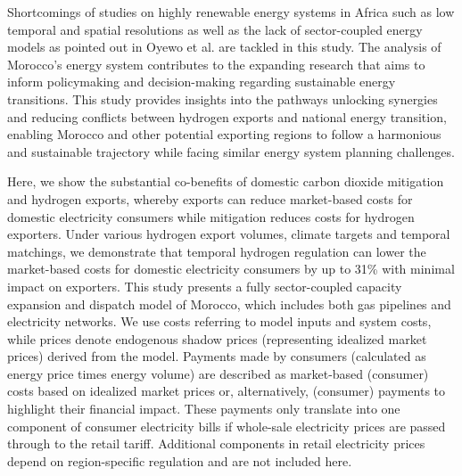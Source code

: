 Shortcomings of studies on highly renewable energy systems in Africa such as low temporal and spatial resolutions as well as the lack of sector-coupled energy models as pointed out in Oyewo et al.\cite{Oyewo2023} are tackled in this study. The analysis of Morocco's energy system contributes to the expanding research that aims to inform policymaking and decision-making regarding sustainable energy transitions. This study provides insights into the pathways unlocking synergies and reducing conflicts between hydrogen exports and national energy transition, enabling Morocco and other potential exporting regions to follow a harmonious and sustainable trajectory while facing similar energy system planning challenges.







Here, we show the substantial co-benefits of domestic carbon dioxide mitigation and hydrogen exports, whereby exports can reduce market-based costs for domestic electricity consumers while mitigation reduces costs for hydrogen exporters.
Under various hydrogen export volumes, climate targets and temporal matchings, we demonstrate 
that temporal hydrogen regulation can lower the market-based costs for domestic electricity consumers by up to 31\% with minimal impact on exporters.
This study presents a fully sector-coupled capacity expansion and dispatch model of Morocco, which includes both gas pipelines and electricity networks. 
We use costs referring to model inputs and system costs, while prices denote endogenous shadow prices (representing idealized market prices) derived from the model. Payments made by consumers (calculated as energy price times energy volume) are described as market-based (consumer) costs based on idealized market prices or, alternatively, (consumer) payments to highlight their financial impact. 
These payments only translate into one component of consumer electricity bills if whole-sale electricity prices are passed through to the retail tariff. Additional components in retail electricity prices depend on region-specific regulation and are not included here.
